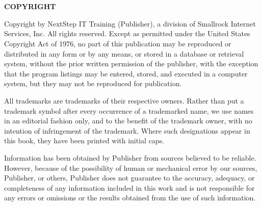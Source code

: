 \documentclass[../workbook]{subfiles}
\begin{document}

\newcommand{\teamMember}[1]{%
    \textbf{#1}
}

\newcommand{\teamMemberTitle}[1]{%
    #1
}


\section*{\bookcoursenumber{} \bookmajortitle}

\parbox{\textwidth}{

    \footnotesize
    \raggedright
    \setlength{\parskip}{1.25em}

    \par{
        \textbf{COPYRIGHT}
    }

    \par{
        Copyright \bookcopyrightyears{} by NextStep IT Training (Publisher), a division of Smallrock Internet Services, Inc.
        All rights reserved. Except as permitted under the United States Copyright Act of 1976, no part of this publication may be reproduced or distributed in any form or by any means, or stored in a database or retrieval system, without the prior written permission of the publisher, with the exception that the program listings may be entered, stored, and executed in a computer system, but they may not be reproduced for publication.
    }
    

    \par{
        All trademarks are trademarks of their respective owners.
        Rather than put a trademark symbol after every occurrence of a trademarked name, we use names in an editorial fashion only, and to the benefit of the trademark owner, with no intention of infringement of the trademark.
        Where such designations appear in this book, they have been printed with initial caps.
    }

    \par{
        Information has been obtained by Publisher from sources believed to be reliable.
        However, because of the possibility of human or mechanical error by our sources, Publisher, or others, Publisher does not guarantee to the accuracy, adequacy, or completeness of any information included in this work and is not responsible for any errors or omissions or the results obtained from the use of such information.
    }

}
\end{document}
